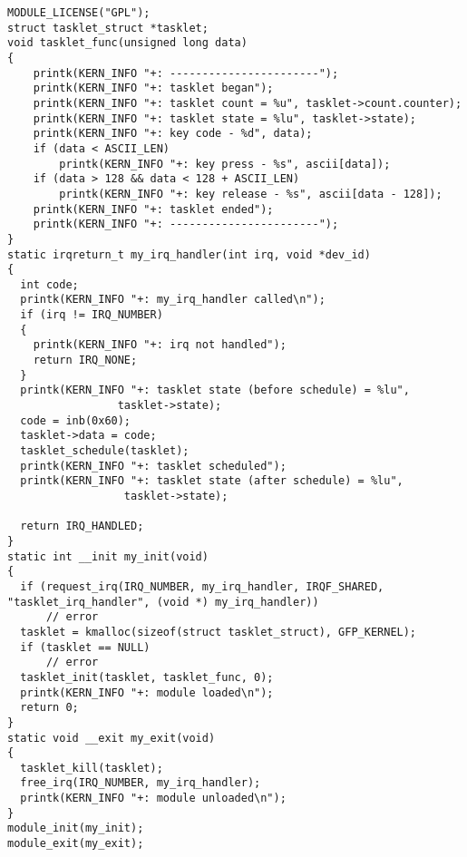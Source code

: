 \begin{lstlisting}
MODULE_LICENSE("GPL");
struct tasklet_struct *tasklet;
void tasklet_func(unsigned long data)
{
    printk(KERN_INFO "+: -----------------------");
    printk(KERN_INFO "+: tasklet began");
    printk(KERN_INFO "+: tasklet count = %u", tasklet->count.counter);
    printk(KERN_INFO "+: tasklet state = %lu", tasklet->state);
    printk(KERN_INFO "+: key code - %d", data);
    if (data < ASCII_LEN)
        printk(KERN_INFO "+: key press - %s", ascii[data]);
    if (data > 128 && data < 128 + ASCII_LEN)
        printk(KERN_INFO "+: key release - %s", ascii[data - 128]);
    printk(KERN_INFO "+: tasklet ended");
    printk(KERN_INFO "+: -----------------------");
}
static irqreturn_t my_irq_handler(int irq, void *dev_id)
{
  int code;
  printk(KERN_INFO "+: my_irq_handler called\n");
  if (irq != IRQ_NUMBER)
  {
    printk(KERN_INFO "+: irq not handled");
    return IRQ_NONE;
  }
  printk(KERN_INFO "+: tasklet state (before schedule) = %lu",
                 tasklet->state);
  code = inb(0x60);
  tasklet->data = code;
  tasklet_schedule(tasklet);
  printk(KERN_INFO "+: tasklet scheduled");
  printk(KERN_INFO "+: tasklet state (after schedule) = %lu",
                  tasklet->state);
               
  return IRQ_HANDLED;
}
static int __init my_init(void) 
{
  if (request_irq(IRQ_NUMBER, my_irq_handler, IRQF_SHARED, "tasklet_irq_handler", (void *) my_irq_handler))
      // error
  tasklet = kmalloc(sizeof(struct tasklet_struct), GFP_KERNEL);
  if (tasklet == NULL)
      // error
  tasklet_init(tasklet, tasklet_func, 0);
  printk(KERN_INFO "+: module loaded\n");
  return 0;
}
static void __exit my_exit(void)
{
  tasklet_kill(tasklet);
  free_irq(IRQ_NUMBER, my_irq_handler);
  printk(KERN_INFO "+: module unloaded\n");
}
module_init(my_init);
module_exit(my_exit);
\end{lstlisting}

